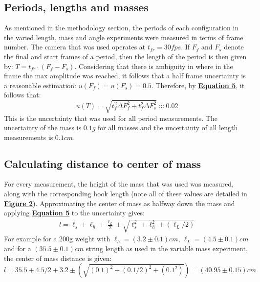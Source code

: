 \documentclass[
	letterpaper
	12pt
]{template}
\newcommand{\bref}[2]{\textbf{\hyperref[#1]{#2}}}
\begin{document}
\subsection{Periods, lengths and masses}\label{uncertainty}
As mentioned in the methodology section, the periods of each configuration in the varied length, mass and angle experiments were measured in terms of frame number. The camera that was used operates at $t_{fr} = 30\unit{fps}$. If $F_f$ and $F_s$ denote the final and start frames of a period, then the length of the period is then given by: $T = t_{fr}\cdot (F_f-F_s)$. Considering that there is ambiguity in where in the frame the max amplitude was reached, it follows that a half frame uncertainty is a reasonable estimation: $u(F_f)=u(F_s) = 0.5$. Therefore, by \bref{eqn::genUncert}{Equation 5}, it follows that:
\[u(T) = \sqrt{t_f^2\Delta F_f^2 + t_f^2\Delta F_s^2} \approx 0.02\]
This is the uncertainty that was used for all period measurements. The uncertainty of the mass is $0.1\unit{g}$ for all masses and the uncertainty of all length measurements is $0.1\unit{cm}$.
\subsection{Calculating distance to center of mass}\label{sec::distance}
For every measurement, the height of the mass that was used was measured, along with the corresponding hook length (note all of these values are detailed in \bref{side}{Figure 2}). Approximating the center of mass as halfway down the mass and applying \bref{eqn::genUncert}{Equation 5} to the uncertainty gives:
\begin{align*}
	l = \ell_s + \ell_h + \frac{\ell_L}2\pm\sqrt{\ell_s^2 + \ell_h^2 +\left( {\ell_L}/2 \right)}
\end{align*}
For example for a 200g weight with $\ell_h = (3.2\pm 0.1)\unit{cm}$, $\ell_L = (4.5\pm0.1)\unit{cm}$ and for a $(35.5\pm0.1)\unit{cm}$ string length as used in the variable mass experiment, the center of mass distance is given:
\[l = 35.5 + 4.5/2 + 3.2 \pm (\sqrt{(0.1)^2 + (0.1/2)^2 + (0.1^2)}) = (40.95\pm 0.15)\unit{cm}\]
\end{document}
